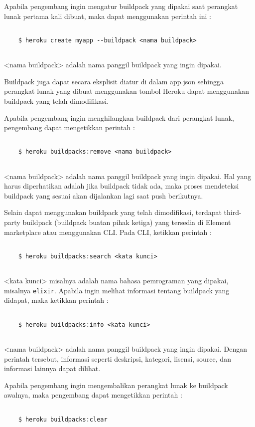 Apabila pengembang ingin mengatur buildpack yang dipakai saat perangkat lunak pertama kali dibuat, maka dapat menggunakan perintah ini :
\begin{lstlisting}

	$ heroku create myapp --buildpack <nama buildpack>
	
\end{lstlisting}
<nama buildpack> adalah nama panggil buildpack yang ingin dipakai.

Buildpack juga dapat secara eksplisit diatur di dalam app.json sehingga perangkat lunak yang dibuat menggunakan tombol Heroku dapat menggunakan buildpack yang telah dimodifikasi.

Apabila pengembang ingin menghilangkan buildpack dari perangkat lunak, pengembang dapat mengetikkan perintah :
\begin{lstlisting}

	$ heroku buildpacks:remove <nama buildpack>
	
\end{lstlisting}
<nama buildpack> adalah nama panggil buildpack yang ingin dipakai. Hal yang harus diperhatikan adalah jika buildpack tidak ada, maka proses mendeteksi buildpack yang sesuai akan dijalankan lagi saat push berikutnya.

Selain dapat menggunakan buildpack yang telah dimodifikasi, terdapat third-party buildpack (buildpack buatan pihak ketiga) yang tersedia di Element marketplace atau menggunakan CLI. Pada CLI, ketikkan perintah :
\begin{lstlisting}

	$ heroku buildpacks:search <kata kunci>
	
\end{lstlisting}
<kata kunci> misalnya adalah nama bahasa pemrograman yang dipakai, misalnya \texttt{elixir}. Apabila ingin melihat informasi tentang buildpack yang didapat, maka ketikkan perintah :
\begin{lstlisting}

	$ heroku buildpacks:info <kata kunci>
	
\end{lstlisting}
<nama buildpack> adalah nama panggil buildpack yang ingin dipakai. Dengan perintah tersebut, informasi seperti deskripsi, kategori, lisensi, source, dan informasi lainnya dapat dilihat.

Apabila pengembang ingin mengembalikan perangkat lunak ke buildpack awalnya, maka pengembang dapat mengetikkan perintah :
\begin{lstlisting}

	$ heroku buildpacks:clear
	
\end{lstlisting}

